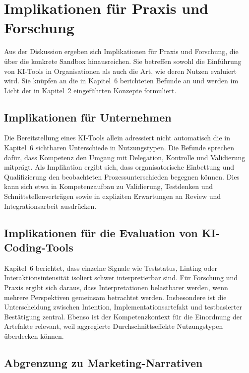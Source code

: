 \section{Implikationen für Praxis und Forschung}
\label{sec:discussion_implications}

Aus der Diskussion ergeben sich Implikationen für Praxis und Forschung, die über die konkrete Sandbox hinausreichen.
Sie betreffen sowohl die Einführung von KI-Tools in Organisationen als auch die Art, wie deren Nutzen evaluiert wird.
Sie knüpfen an die in Kapitel~6 berichteten Befunde an und werden im Licht der in Kapitel~2 eingeführten Konzepte formuliert.

\subsection{Implikationen für Unternehmen}
\label{sec:discussion_implications_practice}

Die Bereitstellung eines KI-Tools allein adressiert nicht automatisch die in Kapitel~6 sichtbaren Unterschiede in Nutzungstypen.
Die Befunde sprechen dafür, dass Kompetenz den Umgang mit Delegation, Kontrolle und Validierung mitprägt.
Als Implikation ergibt sich, dass organisatorische Einbettung und Qualifizierung den beobachteten Prozessunterschieden begegnen können.
Dies kann sich etwa in Kompetenzaufbau zu Validierung, Testdenken und Schnittstellenverträgen sowie in expliziten Erwartungen an Review und Integrationsarbeit ausdrücken.

\subsection{Implikationen für die Evaluation von KI-Coding-Tools}
\label{sec:discussion_implications_evaluation}

Kapitel~6 berichtet, dass einzelne Signale wie Teststatus, Linting oder Interaktionsintensität isoliert schwer interpretierbar sind.
Für Forschung und Praxis ergibt sich daraus, dass Interpretationen belastbarer werden, wenn mehrere Perspektiven gemeinsam betrachtet werden.
Insbesondere ist die Unterscheidung zwischen Intention, Implementationsartefakt und testbasierter Bestätigung zentral.
Ebenso ist der Kompetenzkontext für die Einordnung der Artefakte relevant, weil aggregierte Durchschnittseffekte Nutzungstypen überdecken können.

\subsection{Abgrenzung zu Marketing-Narrativen}
\label{sec:discussion_marketing}

